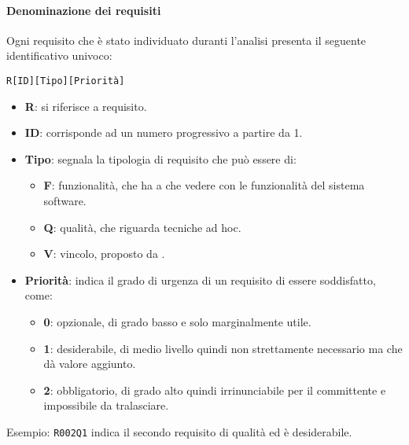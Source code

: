 		\paragraph{Denominazione dei requisiti}\label{PP:Sviluppo:AdR:DenominazioneRequisiti}
		Ogni requisito che è stato individuato duranti l'analisi presenta il seguente identificativo univoco:
		\begin{center}
			\texttt{R[ID][Tipo][Priorità]}
		\end{center}

		\begin{itemize}
			\item \textbf{R}: si riferisce a requisito.
		 	\item \textbf{ID}: corrisponde ad un numero progressivo a partire da 1.
		 	\item \textbf{Tipo}: segnala la tipologia di requisito che può essere di:
		 	\begin{itemize}
		 		\item \textbf{F}: funzionalità, che ha a che vedere con le funzionalità del sistema software.
		 		\item \textbf{Q}: qualità, che riguarda tecniche ad hoc.
		 		\item \textbf{V}: vincolo, proposto da \II.
		 	\end{itemize}
	 		\item \textbf{Priorità}: indica il grado di urgenza di un requisito di essere soddisfatto, come:
	 		\begin{itemize}
	 			\item \textbf{0}: opzionale, di grado basso e solo marginalmente utile.
	 			\item \textbf{1}: desiderabile, di medio livello quindi non strettamente necessario ma che dà valore aggiunto.
	 			\item \textbf{2}: obbligatorio, di grado alto quindi irrinunciabile per il committente e impossibile da tralasciare.
	 		\end{itemize}
		\end{itemize}
	
		Esempio: \texttt{R002Q1} indica il secondo requisito di qualità ed è desiderabile.
	

